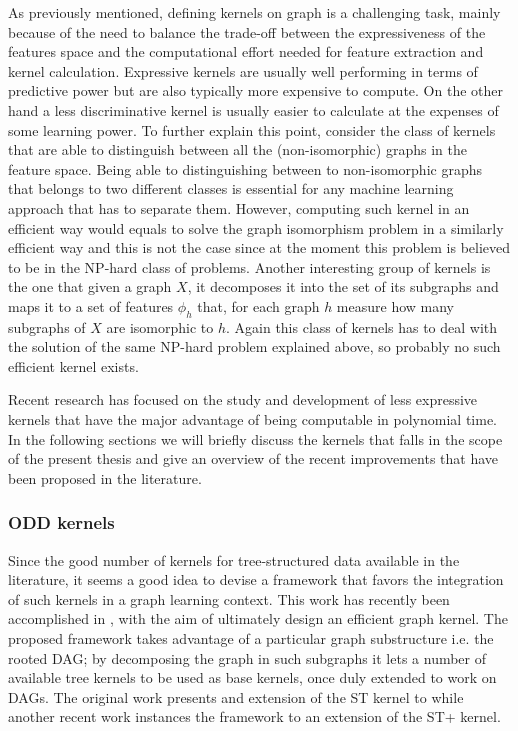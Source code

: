 As previously mentioned, defining kernels on graph is a challenging task, mainly
because of the need to balance the trade-off between the expressiveness of the
features space and the computational effort needed for feature extraction and
kernel calculation.
Expressive kernels are usually well performing in terms of predictive power but
are also typically more expensive to compute.
On the other hand a less discriminative kernel is usually easier to calculate
at the expenses of some learning power.
To further explain this point, consider the class of kernels that are able to
distinguish between all the (non-isomorphic) graphs in the feature space.
Being able to distinguishing between to non-isomorphic graphs that belongs to two
different classes is essential for any machine learning approach that has to
separate them.
However, computing such kernel in an efficient way would equals to solve the
graph isomorphism problem in a similarly efficient way and this is not the case
since at the moment this problem is believed to be in the NP-hard class of problems.
Another interesting group of kernels is the one that given a graph $X$, it decomposes
it into the set of its subgraphs and maps it to a set of features $\phi_h$ that, for
each graph $h$ measure how many subgraphs of $X$ are isomorphic to $h$.
Again this class of kernels has to deal with the solution of the same NP-hard
problem explained above, so probably no such efficient kernel exists.

Recent research has focused on the study and development of less expressive
kernels that have the major advantage of being computable in polynomial time.
In the following sections we will briefly discuss the kernels that falls in the
scope of the present thesis and give an overview of the recent improvements that
have been proposed in the literature.

\subsubsection{ODD kernels}
\label{subsubsec:odd}

Since the good number of kernels for tree-structured data available in the
literature, it seems a good idea to devise a framework that favors the integration
of such kernels in a graph learning context.
This work has recently been accomplished in \cite{DBLP:conf/sdm/MartinoNS12}, with the aim of ultimately
design an efficient graph kernel.
The proposed framework takes advantage of a particular graph substructure i.e.
the rooted DAG; by decomposing the graph in such subgraphs it lets a number
of available tree kernels to be used as base kernels, once duly extended to work
on DAGs.
The original work presents and extension of the ST kernel to while another
recent work \cite{dasanmartino2015exploiting} instances the framework to an extension of the ST+
kernel.

